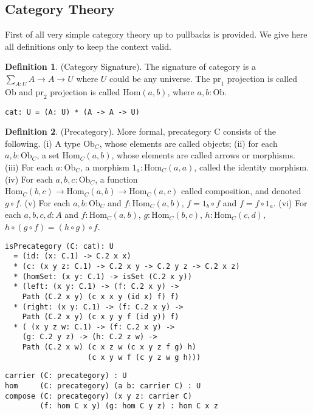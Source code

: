 \documentclass{article}
\theoremstyle{definition}
\newtheorem{definition}{Definition}
\begin{document}
\subsection*{Category Theory}

First of all very simple category theory up to pullbacks is provided. We give here
all definitions only to keep the context valid.

\begin{definition} (Category Signature). The signature of category is
a $\sum_{A:U}A \rightarrow A \rightarrow U$ where $U$ could be any universe.
The $\mathrm{pr}_1$ projection is called $\mathrm{Ob}$ and $\mathrm{pr}_2$ projection is
called $\mathrm{Hom}(a,b)$, where $a,b:\mathrm{Ob}$.
\begin{lstlisting}
cat: U = (A: U) * (A -> A -> U)
\end{lstlisting}
\end{definition}

\begin{definition} (Precategory). More formal, precategory $\mathrm{C}$ consists of the following.
(i) A type $\mathrm{Ob}_C$, whose elements are called objects;
(ii) for each $a,b: \mathrm{Ob}_C$, a set $\mathrm{Hom}_C(a,b)$, whose elements are called arrows or morphisms.
(iii) For each $a: \mathrm{Ob}_C$, a morphism $1_a : \mathrm{Hom}_C(a,a)$, called the identity morphism.
(iv) For each $a,b,c: \mathrm{Ob}_C$, a function
     $\mathrm{Hom}_C(b,c) \rightarrow \mathrm{Hom}_C(a,b) \rightarrow \mathrm{Hom}_C(a,c)$
     called composition, and denoted $g \circ f$.
(v) For each $a,b: \mathrm{Ob}_C$ and $f: \mathrm{Hom}_C(a,b)$, $f = 1_b \circ f$ and $f = f \circ 1_a$.
(vi) For each $a,b,c,d: A$ and $f: \mathrm{Hom}_C(a,b)$, $g: \mathrm{Hom}_C(b,c)$, $h: \mathrm{Hom}_C(c,d)$,
     $h \circ (g \circ f ) = (h \circ g) \circ f$.
\begin{lstlisting}
isPrecategory (C: cat): U
  = (id: (x: C.1) -> C.2 x x)
  * (c: (x y z: C.1) -> C.2 x y -> C.2 y z -> C.2 x z)
  * (homSet: (x y: C.1) -> isSet (C.2 x y))
  * (left: (x y: C.1) -> (f: C.2 x y) ->
    Path (C.2 x y) (c x x y (id x) f) f)
  * (right: (x y: C.1) -> (f: C.2 x y) ->
    Path (C.2 x y) (c x y y f (id y)) f)
  * ( (x y z w: C.1) -> (f: C.2 x y) ->
    (g: C.2 y z) -> (h: C.2 z w) ->
    Path (C.2 x w) (c x z w (c x y z f g) h)
                   (c x y w f (c y z w g h)))
\end{lstlisting}
\begin{lstlisting}
carrier (C: precategory) : U
hom     (C: precategory) (a b: carrier C) : U
compose (C: precategory) (x y z: carrier C)
        (f: hom C x y) (g: hom C y z) : hom C x z
\end{lstlisting}
\end{definition}
\end{document}
